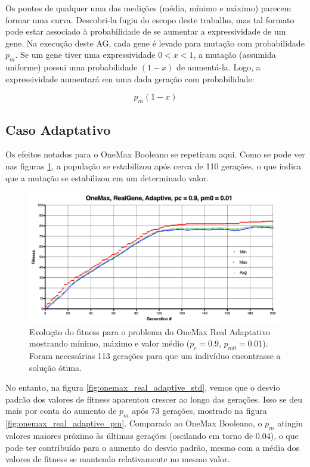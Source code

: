 Os pontos de qualquer uma das medições (média, mínimo e máximo) parecem formar uma curva. Descobri-la fugiu do escopo deste trabalho, mas tal formato pode estar associado à probabilidade de se aumentar a expressividade de um gene. Na execução deste AG, cada gene é levado para mutação com probabilidade $p_m$. Se um gene tiver uma expressividade $0 < x < 1$, a mutação (assumida uniforme) possui uma probabilidade $(1-x)$ de aumentá-la. Logo, a expressividade aumentará em uma dada geração com probabilidade:

\begin{equation}
	p_m(1-x)
\end{equation}

\subsection{Caso Adaptativo}

Os efeitos notados para o OneMax Booleano se repetiram aqui. Como se pode ver nas figuras \ref{fig:onemax_real_adaptive}, a população se estabilizou após cerca de 110 gerações, o que indica que a mutação se estabilizou em um determinado valor.

\begin{figure}[ht!]
    \centering \includegraphics[width=1.0\textwidth]{onemax_real_adaptive.jpg}
    \caption{Evolução do fitness para o problema do OneMax Real Adaptativo mostrando mínimo, máximo e valor médio ($p_c=0.9$, $p_{m0}=0.01$). Foram necessárias 113 gerações para que um indivíduo encontrasse a solução ótima.}
    \label{fig:onemax_real_adaptive}
\end{figure}

No entanto, na figura \ref{fig:onemax_real_adaptive_std}, vemos que o desvio padrão dos valores de fitness aparentou crescer ao longo das gerações. Isso se deu mais por conta do aumento de $p_m$ após 73 gerações, mostrado na figura \ref{fig:onemax_real_adaptive_pm}. Comparado ao OneMax Booleano, o $p_m$ atingiu valores maiores próximo às últimas gerações (oscilando em torno de 0.04), o que pode ter contribuído para o aumento do desvio padrão, mesmo com a média dos valores de fitness se mantendo relativamente no mesmo valor.

